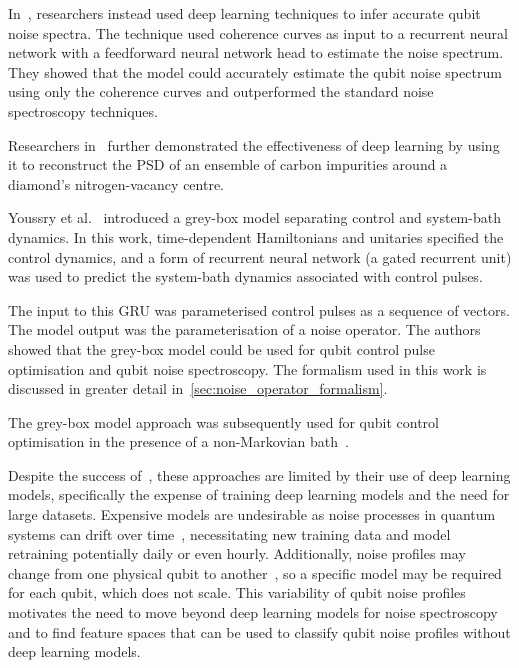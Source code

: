 \documentclass[12pt]{iopart}
\begin{document}
In~\cite{wise2021using}, researchers instead used deep learning techniques to infer accurate qubit noise spectra. The technique used coherence curves as input to a recurrent neural network with a feedforward neural network head to estimate the noise spectrum. They showed that the model could accurately estimate the qubit noise spectrum using only the coherence curves and outperformed the standard noise spectroscopy techniques.

Researchers in~\cite{martina2023deep} further demonstrated the effectiveness of deep learning by using it to reconstruct the PSD of an ensemble of carbon impurities around a diamond's nitrogen-vacancy centre.

Youssry et al.~\cite{youssry2020characterization} introduced a grey-box model separating control and system-bath dynamics. In this work, time-dependent Hamiltonians and unitaries specified the control dynamics, and a form of recurrent neural network (a gated recurrent unit) was used to predict the system-bath dynamics associated with control pulses.

The input to this GRU was parameterised control pulses as a sequence of vectors. The model output was the parameterisation of a noise operator. The authors showed that the grey-box model could be used for qubit control pulse optimisation and qubit noise spectroscopy. The formalism used in this work is discussed in greater detail in~\cref{sec:noise_operator_formalism}.

The grey-box model approach was subsequently used for qubit control optimisation in the presence of a non-Markovian bath~\cite{youssry2022multi}.

Despite the success of~\cite{wise2021using,martina2023deep,youssry2020characterization,youssry2022multi}, these approaches are limited by their use of deep learning models, specifically the expense of training deep learning models and the need for large datasets. Expensive models are undesirable as noise processes in quantum systems can drift over time~\cite{seedhouse2023spatio,nakamura2024gate}, necessitating new training data and model retraining potentially daily or even hourly. Additionally, noise profiles may change from one physical qubit to another~\cite {sung2019non}, so a specific model may be required for each qubit, which does not scale. This variability of qubit noise profiles motivates the need to move beyond deep learning models for noise spectroscopy and to find feature spaces that can be used to classify qubit noise profiles without deep learning models.
\end{document}

